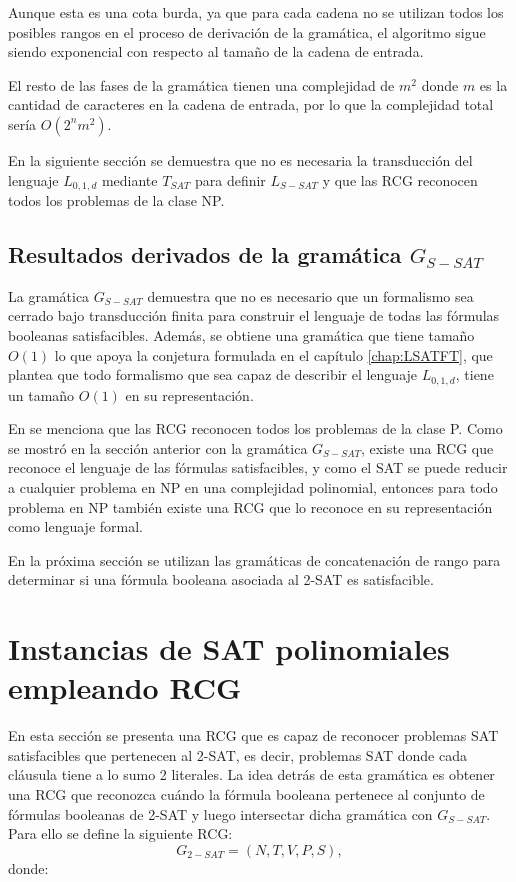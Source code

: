\documentclass[12pt]{article}
\begin{document}
Aunque esta es una cota burda, ya que para cada cadena no se utilizan todos los posibles rangos en el proceso de derivación de la gramática, el algoritmo sigue siendo exponencial con respecto al tamaño de la cadena de entrada.

El resto de las fases de la gramática tienen una complejidad de $m^2$ donde $m$
es la cantidad de caracteres en la cadena de entrada, por lo que la complejidad total sería $O(2^nm^2)$.

En la siguiente sección se demuestra que no es necesaria la transducción del lenguaje $L_{0,1,d}$ mediante $T_{SAT}$
para definir $L_{S-SAT}$ y que las RCG reconocen todos los problemas de la clase NP.
\subsection{Resultados derivados de la gramática $G_{S-SAT}$}

La gramática $G_{S-SAT}$ demuestra que no es necesario que un formalismo sea cerrado bajo transducción 
finita para construir el lenguaje de todas las fórmulas booleanas satisfacibles. Además, se obtiene una 
gramática que tiene tamaño $O(1)$ lo que apoya la conjetura formulada en el capítulo \ref{chap:LSATFT}, 
que plantea que todo formalismo que sea capaz de describir el lenguaje $L_{0,1,d}$, tiene un tamaño $O(1)$ en su representación.

En \cite{mainRCGBib} se menciona que las RCG reconocen todos los problemas de la clase P. Como se mostró en la sección anterior con la gramática $G_{S-SAT}$, existe una RCG que reconoce el lenguaje de las fórmulas satisfacibles, y como el SAT se puede reducir a cualquier problema en NP en una complejidad polinomial, entonces para todo problema en NP también existe una RCG que lo reconoce en su representación como lenguaje formal.

En la próxima sección se utilizan las gramáticas de concatenación de rango para determinar si una fórmula booleana asociada al 2-SAT es satisfacible.

\section{Instancias de SAT polinomiales empleando RCG}
\label{sec:pSATRCG}

En esta sección se presenta una RCG que es capaz de reconocer problemas SAT satisfacibles que pertenecen al 2-SAT, es decir, problemas SAT donde cada cláusula tiene a lo sumo 2 literales. La idea detrás de esta gramática es obtener una RCG que reconozca cuándo la fórmula booleana pertenece al conjunto de fórmulas booleanas de 2-SAT y luego intersectar dicha gramática con $G_{S-SAT}$.  Para ello se define la siguiente RCG:
\[
    G_{2-SAT} = (N, T, V, P, S),
\]
donde:
\end{document}
